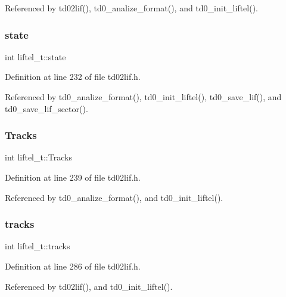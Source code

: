 Referenced by td02lif(), td0\+\_\+analize\+\_\+format(), and td0\+\_\+init\+\_\+liftel().

\mbox{\label{structliftel__t_a579b9a2411fc6cf4bcdd4cac15d48e49}} 
\subsubsection{\texorpdfstring{state}{state}}
{\footnotesize\ttfamily int liftel\+\_\+t\+::state}



Definition at line 232 of file td02lif.\+h.



Referenced by td0\+\_\+analize\+\_\+format(), td0\+\_\+init\+\_\+liftel(), td0\+\_\+save\+\_\+lif(), and td0\+\_\+save\+\_\+lif\+\_\+sector().

\mbox{\label{structliftel__t_a1c433cb2546f09c4093f0e98d61212b2}} 
\subsubsection{\texorpdfstring{Tracks}{Tracks}}
{\footnotesize\ttfamily int liftel\+\_\+t\+::\+Tracks}



Definition at line 239 of file td02lif.\+h.



Referenced by td0\+\_\+analize\+\_\+format(), and td0\+\_\+init\+\_\+liftel().

\mbox{\label{structliftel__t_a24244c0ee111d3f46eedd7578eb1acf7}} 
\subsubsection{\texorpdfstring{tracks}{tracks}}
{\footnotesize\ttfamily int liftel\+\_\+t\+::tracks}



Definition at line 286 of file td02lif.\+h.



Referenced by td02lif(), and td0\+\_\+init\+\_\+liftel().

